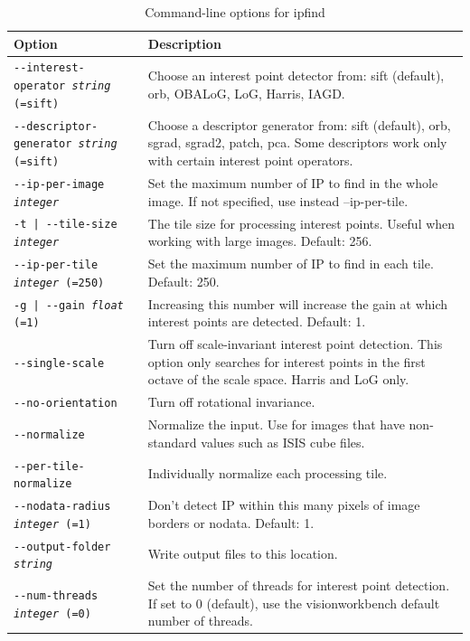 \begin{longtable}{|l|p{9.5cm}|}
\caption{Command-line options for ipfind}
\label{tbl:ipfind}
\endfirsthead
\endhead
\endfoot
\endlastfoot
\hline
Option & Description \\ \hline \hline
\texttt{-\/-interest-operator \textit{string} (=sift) } & Choose an interest point detector from: sift (default), orb, OBALoG, LoG, Harris, IAGD.\\ \hline
\texttt{-\/-descriptor-generator \textit{string} (=sift) } & Choose a descriptor generator from: sift (default), orb, sgrad, sgrad2, patch, pca. Some descriptors work only with certain interest point operators.\\ \hline
\texttt{-\/-ip-per-image \textit{integer}} & Set the maximum number of IP to find in the whole image. If not specified, use instead --ip-per-tile.\\ \hline
\texttt{-t | -\/-tile-size  \textit{integer}  } & The tile size for processing interest points. Useful when working with large images. Default: 256.\\ \hline
\texttt{-\/-ip-per-tile \textit{integer} (=250) } & Set the maximum number of IP to find in each tile. Default: 250.\\ \hline
\texttt{-g | -\/-gain  \textit{float} (=1) } & Increasing this number will increase the gain at which interest points are detected. Default: 1.\\ \hline
\texttt{-\/-single-scale  } & Turn off scale-invariant interest point detection. This option only searches for interest points in the first octave of the scale space. Harris and LoG only.\\ \hline
\texttt{-\/-no-orientation  } & Turn off rotational invariance.\\ \hline
\texttt{-\/-normalize  } & Normalize the input. Use for images that have non-standard values such as ISIS cube files.\\ \hline
\texttt{-\/-per-tile-normalize  } & Individually normalize each processing tile.\\ \hline
\texttt{-\/-nodata-radius \textit{integer} (=1) } & Don't detect IP within this many pixels of image borders or nodata. Default: 1.\\ \hline
\texttt{-\/-output-folder \textit{string}  } & Write output files to this location.\\ \hline
\texttt{-\/-num-threads \textit{integer} (=0) } & Set the number of threads for interest point detection. If set to 0 (default), use the visionworkbench default number of threads.\\ \hline

\end{longtable}
